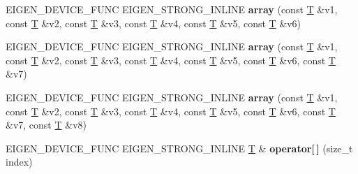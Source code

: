 \begin{DoxyCompactItemize}
\item 
\mbox{\label{class_eigen_1_1array_ad4a1486b7b6700963be85653d0add313}} 
E\+I\+G\+E\+N\+\_\+\+D\+E\+V\+I\+C\+E\+\_\+\+F\+U\+NC E\+I\+G\+E\+N\+\_\+\+S\+T\+R\+O\+N\+G\+\_\+\+I\+N\+L\+I\+NE {\bfseries array} (const \hyperlink{group___sparse_core___module}{T} \&v1, const \hyperlink{group___sparse_core___module}{T} \&v2, const \hyperlink{group___sparse_core___module}{T} \&v3, const \hyperlink{group___sparse_core___module}{T} \&v4, const \hyperlink{group___sparse_core___module}{T} \&v5, const \hyperlink{group___sparse_core___module}{T} \&v6)
\item 
\mbox{\label{class_eigen_1_1array_a22e1f701835988db917c9d13d493e086}} 
E\+I\+G\+E\+N\+\_\+\+D\+E\+V\+I\+C\+E\+\_\+\+F\+U\+NC E\+I\+G\+E\+N\+\_\+\+S\+T\+R\+O\+N\+G\+\_\+\+I\+N\+L\+I\+NE {\bfseries array} (const \hyperlink{group___sparse_core___module}{T} \&v1, const \hyperlink{group___sparse_core___module}{T} \&v2, const \hyperlink{group___sparse_core___module}{T} \&v3, const \hyperlink{group___sparse_core___module}{T} \&v4, const \hyperlink{group___sparse_core___module}{T} \&v5, const \hyperlink{group___sparse_core___module}{T} \&v6, const \hyperlink{group___sparse_core___module}{T} \&v7)
\item 
\mbox{\label{class_eigen_1_1array_aa07130c201d8748970b3161fd243db07}} 
E\+I\+G\+E\+N\+\_\+\+D\+E\+V\+I\+C\+E\+\_\+\+F\+U\+NC E\+I\+G\+E\+N\+\_\+\+S\+T\+R\+O\+N\+G\+\_\+\+I\+N\+L\+I\+NE {\bfseries array} (const \hyperlink{group___sparse_core___module}{T} \&v1, const \hyperlink{group___sparse_core___module}{T} \&v2, const \hyperlink{group___sparse_core___module}{T} \&v3, const \hyperlink{group___sparse_core___module}{T} \&v4, const \hyperlink{group___sparse_core___module}{T} \&v5, const \hyperlink{group___sparse_core___module}{T} \&v6, const \hyperlink{group___sparse_core___module}{T} \&v7, const \hyperlink{group___sparse_core___module}{T} \&v8)
\item 
\mbox{\label{class_eigen_1_1array_a0685bf062d0186b34a6cff47c953d7ef}} 
E\+I\+G\+E\+N\+\_\+\+D\+E\+V\+I\+C\+E\+\_\+\+F\+U\+NC E\+I\+G\+E\+N\+\_\+\+S\+T\+R\+O\+N\+G\+\_\+\+I\+N\+L\+I\+NE \hyperlink{group___sparse_core___module}{T} \& {\bfseries operator\mbox{[}$\,$\mbox{]}} (size\+\_\+t index)
\item 
\mbox{\label{class_eigen_1_1array_a773e8683e5b0875c4f708c68c5379cd0}} 

\end{DoxyCompactItemize}

